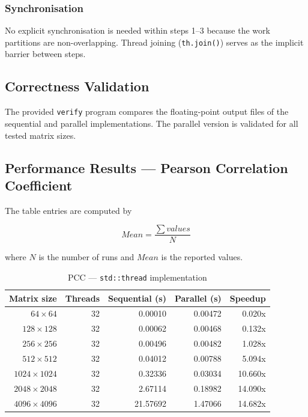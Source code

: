 \documentclass[11pt,a4paper]{article}
\begin{document}
\subsubsection{Synchronisation}

No explicit synchronisation is needed within steps 1--3 because the work partitions are
non-overlapping. Thread joining (\texttt{th.join()}) serves as the implicit barrier between
steps.

\subsection{Correctness Validation}

The provided \texttt{verify} program compares the floating-point output files of the sequential
and parallel implementations. The parallel version is validated for all tested matrix sizes.

\subsection{Performance Results --- Pearson Correlation Coefficient}
The table entries are computed by

$$
Mean = \frac{\sum{values}}{N}
$$

where $N$ is the number of runs and $Mean$ is the reported values.

\begin{table}[h]
\centering
\begin{tabular}{|r|r|r|r|r|}
\hline
\textbf{Matrix size} & \textbf{Threads} & \textbf{Sequential (s)} & \textbf{Parallel (s)} & \textbf{Speedup} \\
\hline
$64 \times 64$     & 32 & 0.00010 & 0.00472 & 0.020x \\
$128 \times 128$   & 32 & 0.00062 & 0.00468 & 0.132x \\
$256 \times 256$   & 32 & 0.00496 & 0.00482 & 1.028x \\
$512 \times 512$   & 32 & 0.04012 & 0.00788 & 5.094x \\
$1024 \times 1024$ & 32 & 0.32336 & 0.03034 & 10.660x \\
$2048 \times 2048$ & 32 & 2.67114 & 0.18982 & 14.090x \\
$4096 \times 4096$ & 32 & 21.57692 & 1.47066 & 14.682x \\
\hline
\end{tabular}
\caption{PCC --- \texttt{std::thread} implementation}
\end{table}
\end{document}
